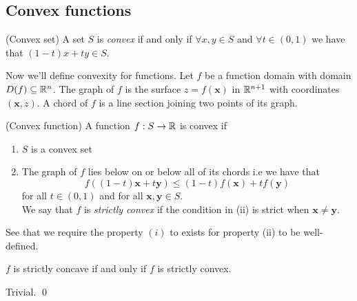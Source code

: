 \documentclass{article}
\begin{document}
\subsection{Convex functions}
\begin{definition}
	(Convex set) A set $ S $ is \textit{convex} if and only if $ \forall x,y\in S $ and $ \forall t\in (0,1) $ we have that $ (1-t)x+ty\in S $.
\end{definition}
Now we'll define convexity for functions. Let $ f $ be a function domain with domain $ D(f)\subseteq \mathbb{R}^n  $. The graph of $ f $ is the surface $ z=f(\mathbf x) $ in $ \mathbb{R}^{n+1} $ with coordinates $ (\mathbf x,z) $. A chord of $ f $ is a line section joining two points of its graph.
\begin{definition}
	(Convex function) A function $ f:S\to \mathbb{R} $ is convex if
	\begin{enumerate}
		\item $ S $ is a convex set
		\item The graph of $ f $ lies below on or below all of its chords i.e we have that
			\[
			  f((1-t)\mathbf x + t\mathbf y)\le (1-t)f(\mathbf x)+tf(\mathbf y)
			\]
			for all $ t\in (0,1) $ and for all $ \mathbf x, \mathbf y \in S $.\\
			We say that $ f $ is \textit{strictly convex} if the condition in (ii) is strict when $ \mathbf x\ne \mathbf y $.
	\end{enumerate}
\end{definition}
\begin{remark}
See that we require the property $ (i) $ to exists for property (ii) to be well-defined.
\end{remark}
\begin{lemma}
  $ f $ is strictly concave if and only if $ f $ is strictly convex.
\end{lemma}
\pf Trivial. \qed
\end{document}
